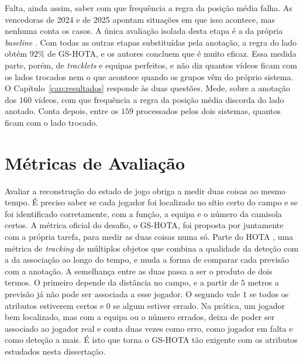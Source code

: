 Falta, ainda assim, saber com que frequência a regra da posição média falha. As vencedoras de 2024 e de 2025 apontam situações em que isso acontece, mas nenhuma conta os casos. A única avaliação isolada desta etapa é a da própria \emph{baseline} \citep{somers2024soccernet}. Com todas as outras etapas substituídas pela anotação, a regra do lado obtém $92\%$ de GS-HOTA, e os autores concluem que é muito eficaz. Essa medida parte, porém, de \emph{tracklets} e equipas perfeitos, e não diz quantos vídeos ficam com os lados trocados nem o que acontece quando os grupos vêm do próprio sistema. O Capítulo~\ref{cap:resultados} responde às duas questões. Mede, sobre a anotação dos $160$ vídeos, com que frequência a regra da posição média discorda do lado anotado. Conta depois, entre os $159$ processados pelos dois sistemas, quantos ficam com o lado trocado.

\section{Métricas de Avaliação}\label{sec:metricas}

Avaliar a reconstrução do estado de jogo obriga a medir duas coisas ao mesmo tempo. É preciso saber se cada jogador foi localizado no sítio certo do campo e se foi identificado corretamente, com a função, a equipa e o número da camisola certos. A métrica oficial do desafio, o GS-HOTA, foi proposta por \citet{somers2024soccernet} juntamente com a própria tarefa, para medir as duas coisas numa só. Parte do HOTA \citep{luiten2021hota}, uma métrica de \emph{tracking} de múltiplos objetos que combina a qualidade da deteção com a da associação ao longo do tempo, e muda a forma de comparar cada previsão com a anotação. A semelhança entre as duas passa a ser o produto de dois termos. O primeiro depende da distância no campo, e a partir de $5$ metros a previsão já não pode ser associada a esse jogador. O segundo vale $1$ se todos os atributos estiverem certos e $0$ se algum estiver errado. Na prática, um jogador bem localizado, mas com a equipa ou o número errados, deixa de poder ser associado ao jogador real e conta duas vezes como erro, como jogador em falta e como deteção a mais. É isto que torna o GS-HOTA tão exigente com os atributos estudados nesta dissertação.


